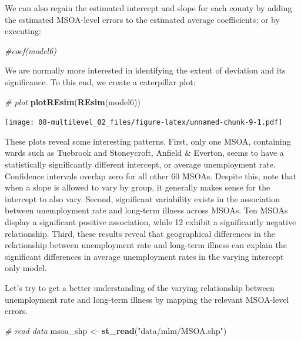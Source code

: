 \documentclass[
]{book}
\newenvironment{Shaded}{\begin{snugshade}}{\end{snugshade}}
\newcommand{\CommentTok}[1]{\textcolor[rgb]{0.56,0.35,0.01}{\textit{#1}}}
\newcommand{\KeywordTok}[1]{\textcolor[rgb]{0.13,0.29,0.53}{\textbf{#1}}}
\newcommand{\NormalTok}[1]{#1}
\newcommand{\StringTok}[1]{\textcolor[rgb]{0.31,0.60,0.02}{#1}}
\begin{document}
We can also regain the estimated intercept and slope for each county by adding the estimated MSOA-level errors to the estimated average coefficients; or by executing:

\begin{Shaded}
\begin{Highlighting}[]
\CommentTok{#coef(model6)}
\end{Highlighting}
\end{Shaded}

We are normally more interested in identifying the extent of deviation and its significance. To this end, we create a caterpillar plot:

\begin{Shaded}
\begin{Highlighting}[]
\CommentTok{# plot}
\KeywordTok{plotREsim}\NormalTok{(}\KeywordTok{REsim}\NormalTok{(model6))}
\end{Highlighting}
\end{Shaded}

\texttt{[image: 08-multilevel\_02\_files/figure-latex/unnamed-chunk-9-1.pdf]}

These plots reveal some interesting patterns. First, only one MSOA, containing wards such as Tuebrook and Stoneycroft, Anfield \& Everton, seems to have a statistically significantly different intercept, or average unemployment rate. Confidence intervals overlap zero for all other 60 MSOAs. Despite this, note that when a slope is allowed to vary by group, it generally makes sense for the intercept to also vary. Second, significant variability exists in the association between unemployment rate and long-term illness across MSOAs. Ten MSOAs display a significant positive association, while 12 exhibit a significantly negative relationship. Third, these results reveal that geographical differences in the relationship between unemployment rate and long-term illness can explain the significant differences in average unemployment rates in the varying intercept only model.

Let's try to get a better understanding of the varying relationship between unemployment rate and long-term illness by mapping the relevant MSOA-level errors.

\begin{Shaded}
\begin{Highlighting}[]
\CommentTok{# read data}
\NormalTok{msoa_shp <-}\StringTok{ }\KeywordTok{st_read}\NormalTok{(}\StringTok{"data/mlm/MSOA.shp"}\NormalTok{)}
\end{Highlighting}
\end{Shaded}
\end{document}
